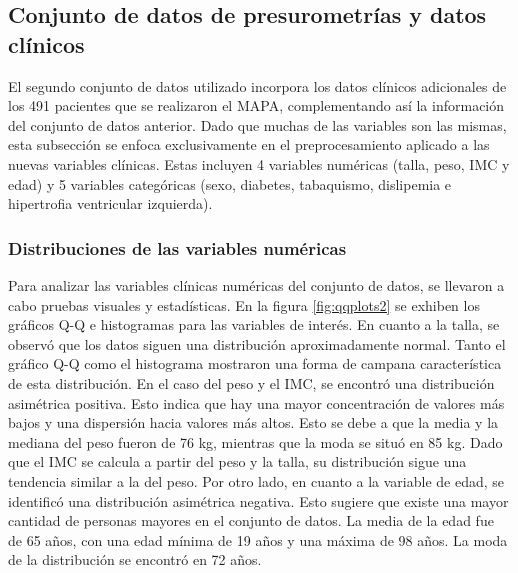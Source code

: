 \subsection{Conjunto de datos de presurometrías y datos clínicos}
\label{sec:Conjunto2}

El segundo conjunto de datos utilizado incorpora los datos clínicos adicionales de los 491 pacientes que 
se realizaron el MAPA, complementando así la información del conjunto de datos anterior. Dado que muchas 
de las variables son las mismas, esta subsección se enfoca exclusivamente en el preprocesamiento aplicado 
a las nuevas variables clínicas. Estas incluyen 4 variables numéricas (talla, peso, IMC y edad) y 5 variables 
categóricas (sexo, diabetes, tabaquismo, dislipemia e hipertrofia ventricular izquierda).


\subsubsection{Distribuciones de las variables numéricas}
Para analizar las variables clínicas numéricas del conjunto de datos, se llevaron a cabo pruebas visuales y 
estadísticas. En la figura \ref{fig:qqplots2} se exhiben los gráficos Q-Q e histogramas para las variables 
de interés. En cuanto a la talla, se observó que los datos siguen una distribución aproximadamente normal. 
Tanto el gráfico Q-Q como el histograma mostraron una forma de campana característica de esta distribución. 
En el caso del peso y el IMC, se encontró una distribución asimétrica positiva. Esto indica que hay una mayor 
concentración de valores más bajos y una dispersión hacia valores más altos. Esto se debe a que la media y la 
mediana del peso fueron de 76 kg, mientras que la moda se situó en 85 kg. Dado que el IMC se calcula a partir 
del peso y la talla, su distribución sigue una tendencia similar a la del peso. Por otro lado, en cuanto a 
la variable de edad, se identificó una distribución asimétrica negativa. Esto sugiere que existe una mayor 
cantidad de personas mayores en el conjunto de datos. La media de la edad fue de 65 años, con una edad mínima 
de 19 años y una máxima de 98 años. La moda de la distribución se encontró en 72 años.

